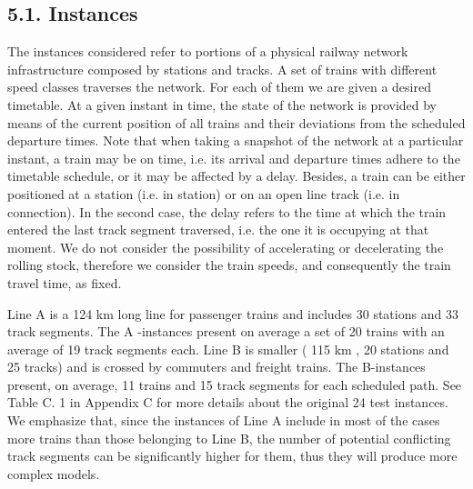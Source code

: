\documentclass[10pt]{article}
\begin{document}
\subsection*{5.1. Instances}
The instances considered refer to portions of a physical railway network infrastructure composed by stations and tracks. A set of trains with different speed classes traverses the network. For each of them we are given a desired timetable. At a given instant in time, the state of the network is provided by means of the current position of all trains and their deviations from the scheduled departure times. Note that when taking a snapshot of the network at a particular instant, a train may be on time, i.e. its arrival and departure times adhere to the timetable schedule, or it may be affected by a delay. Besides, a train can be either positioned at a station (i.e. in station) or on an open line track (i.e. in connection). In the second case, the delay refers to the time at which the train entered the last track segment traversed, i.e. the one it is occupying at that moment. We do not consider the possibility of accelerating or decelerating the rolling stock, therefore we consider the train speeds, and consequently the train travel time, as fixed.

Line A is a 124 km long line for passenger trains and includes 30 stations and 33 track segments. The A -instances present on average a set of 20 trains with an average of 19 track segments each. Line B is smaller ( 115 km , 20 stations and 25 tracks) and is crossed by commuters and freight trains. The B-instances present, on average, 11 trains and 15 track segments for each scheduled path. See Table C. 1 in Appendix C for more details about the original 24 test instances. We emphasize that, since the instances of Line A include in most of the cases more trains than those belonging to Line B, the number of potential conflicting track segments can be significantly higher for them, thus they will produce more complex models.
\end{document}

